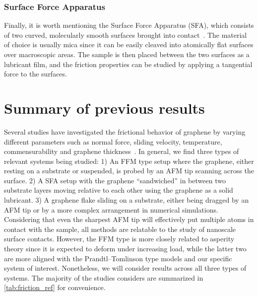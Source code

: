 \subsubsection{Surface Force Apparatus}
Finally, it is worth mentioning the Surface Force Apparatus (\acrshort{SFA}), which consists of two curved, molecularly smooth surfaces brought into contact~\cite[p. 188]{gnecco_meyer_2015}. The material of choice is usually mica since it can be easily cleaved into atomically flat surfaces over macroscopic areas. The sample is then placed between the two surfaces as a lubricant film, and the friction properties can be studied by applying a tangential force to the surfaces.

\section{Summary of previous results}\label{sec:prev_results}
Several studies have investigated the frictional behavior of graphene by varying
different parameters such as normal force, sliding velocity, temperature,
commensurability and graphene thickness~\cite{penkov_tribology_2014}. In
general, we find three types of relevant systems being studied: 1) An
\acrshort{FFM} type setup where the graphene, either resting on a substrate or
suspended, is probed by an \acrshort{AFM} tip scanning across the surface. 2) A
\acrshort{SFA} setup with the graphene ``sandwiched'' in between two substrate
layers moving relative to each other using the graphene as a solid lubricant. 3)
A graphene flake sliding on a substrate, either being dragged by an
\acrshort{AFM} tip or by a more complex arrangement in numerical simulations.
Considering that even the sharpest \acrshort{AFM} tip will effectively put
multiple atoms in contact with the sample, all methods are relatable to the
study of nanoscale surface contacts. However, the \acrshort{FFM} type is more
closely related to asperity theory since it is expected to deform under
increasing load, while the latter two are more aligned with the
Prandtl–Tomlinson type models and our specific system of interest. Nonetheless,
we will consider results across all three types of systems. The majority of the studies considers are summarized in \cref{tab:friction_ref} for convenience. 


